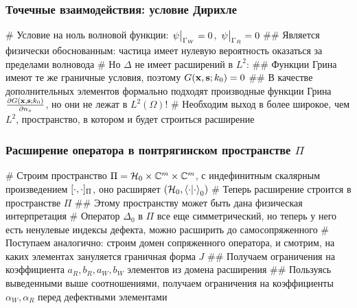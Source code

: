 \documentclass{beamer}
\begin{document}
\begin{frame}[fragile]
\frametitle{Точечные взаимодействия: условие Дирихле}
\begin{easylist}[itemize]
# Условие на ноль волновой функции: $\eval{\psi}_{\Gamma_W} = 0$, $\eval{\psi}_{\Gamma_R} = 0$
## Является физически обоснованным: частица имеет нулевую вероятность оказаться за пределами волновода
# Но $\Delta$ не имеет расширений в $L^2$:
## Функции Грина имеют те же граничные условия, поэтому $G(\vb{x}, \vb{s}; k_0) = 0$
## В качестве дополнительных элементов формально подходят производные функции Грина $\pdv{G(\vb{x}, \vb{s}; k_0)}{n_s}$, но они не лежат в $L^2(\Omega)$!
# Необходим выход в более широкое, чем $L^2$, пространство, в котором и будет строиться расширение
\end{easylist}
\end{frame}

\begin{frame}[fragile]
\frametitle{Расширение оператора в понтрягинском пространстве $\Pi$}
\begin{easylist}[itemize]
# Строим пространство $\Pi = \mathcal{H}_{0} \times \mathbb{C}^m \times \mathbb{C}^m$, с индефинитным скалярным произведением $[\cdot,\cdot]_\Pi$, оно расширяет $(\hilb{0}, \ip{\cdot}{\cdot}_0)$
# Теперь расширение строится в пространстве $\Pi$
## Этому пространству может быть дана физическая интерпретация
# Оператор $\Delta_0$ в $\Pi$ все еще симметрический, но теперь у него есть ненулевые индексы дефекта, можно расширить до самосопряженного
# Поступаем аналогично: строим домен сопряженного оператора, и смотрим, на каких элементах зануляется граничная форма $J$
## Получаем ограничения на коэффициента $a_R, b_R, a_W, b_W$ элементов из домена расширения
## Пользуясь выведенными выше соотношениями, получаем ограничения на коэффициенты $\alpha_W, \alpha_R$ перед дефектными элементами
\end{easylist}
\end{frame}
\end{document}
